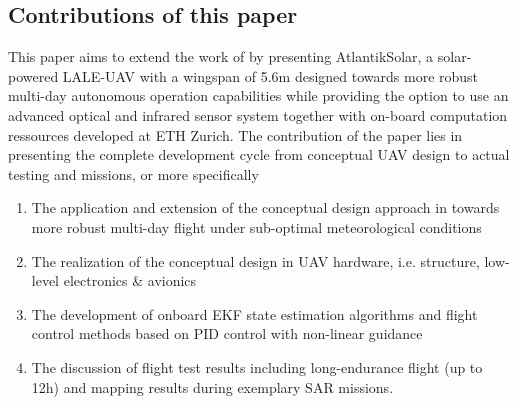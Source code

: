 \subsection{Contributions of this paper}

This paper aims to extend the work of \cite{Cocconi_SoLong,Noth_PhD} by presenting AtlantikSolar, a solar-powered LALE-UAV with a wingspan of 5.6m designed towards more robust multi-day autonomous operation capabilities while providing the option to use an advanced optical and infrared sensor system together with on-board computation ressources developed at ETH Zurich. The contribution of the paper lies in presenting the complete development cycle from conceptual UAV design to actual testing and missions, or more specifically
  
 \begin{enumerate}
\item The application and extension of the conceptual design approach in \cite{Noth_PhD,Leutenegger_JIRS} towards more robust multi-day flight under sub-optimal meteorological conditions
\item The realization of the conceptual design in UAV hardware, i.e. structure, low-level electronics \& avionics 
\item The development of onboard EKF state estimation algorithms and flight control methods based on PID control with non-linear guidance
\item The discussion of flight test results including long-endurance flight (up to 12h) and mapping results during exemplary SAR missions.
\end{enumerate}

